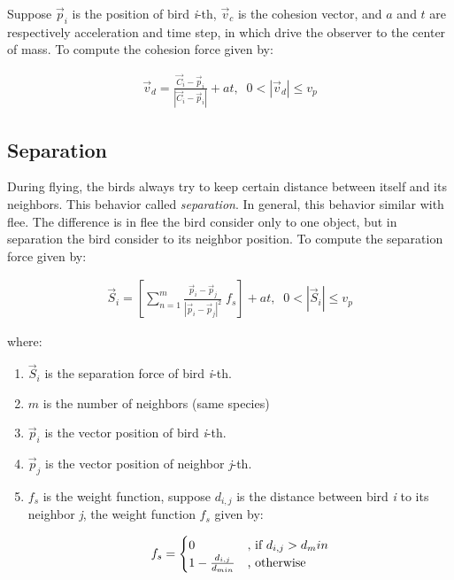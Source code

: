 \documentclass[journal,transmag]{IEEEtran}
\begin{document}
Suppose \(\vec{p}_i\) is the position of bird \emph{i}-th, \(\vec{v}_c\) is the cohesion vector, and \(a\) and \(t\) are respectively acceleration and time step, in which drive the observer to the center of mass. To compute the cohesion force given by:

\begin{align}
\vec{v}_d = \frac{\vec{C}_i - \vec{p}_i}{| \vec{C}_i - \vec{p}_i |} + at, \;\;0 < |\vec{v}_d| \leq v_p
\end{align}

\subsection{Separation}
During flying, the birds always try to keep certain distance between itself and its neighbors. This behavior called \emph{separation}. In general, this behavior similar with flee. The difference is in flee the bird consider only to one object, but in separation the bird consider to its neighbor position. To compute the separation force given by:

\begin{align}
\vec{S}_i = \left[\sum_{n=1}^m{\frac{\vec{p}_i - \vec{p}_j}{|\vec{p}_i - \vec{p}_j|^2}} \;f_s\right] + at, \;\;0 < |\vec{S}_i| \leq v_p
\end{align}

where:

\begin{enumerate}
\item \(\vec{S}_i\) is the separation force of bird \emph{i}-th. 
\item \(m\) is the number of neighbors (same species)
\item \(\vec{p}_i\) is the vector position of bird \emph{i}-th.
\item \(\vec{p}_j\) is the vector position of neighbor \emph{j}-th.
\item \(f_s\) is the weight function, suppose \(d_{i,j}\) is the distance between bird \emph{i} to its neighbor \emph{j}, the weight function \(f_s\) given by:

\begin{equation*}
	f_s = \begin{cases}
	0 &\text{, if $ d_{i,j} > d_min$}\\
	1 - \frac{d_{i,j}}{d_{min}} &\text{, otherwise}
	\end{cases}
\end{equation*}
\end{enumerate}
\end{document}
